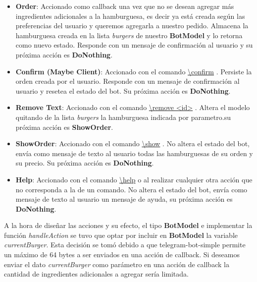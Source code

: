 \documentclass[a4paper,12pt]{article}
\begin{document}
\begin{itemize}
	\item
	\textbf{Order}: Accionado como callback una vez que no se desean agregar más ingredientes adicionales a la hamburguesa, es decir ya está creada según las preferencias del usuario y queremos agregarla a nuestro pedido. Almacena la hamburguesa creada en la lista \textit{burgers} de nuestro \textbf{BotModel} y lo retorna como nuevo estado. Responde con un mensaje de confirmación al usuario y su próxima acción es \textbf{DoNothing}.
	
	\item
	\textbf{Confirm \color{blue}(Maybe Client)\color{black}}: Accionado con el comando 
	\color{blue}\uline{\textbackslash confirm}\color{black}
	. Persiste la orden creada por el usuario. Responde con un mensaje de confirmación al usuario y resetea el estado del bot. Su próxima acción es \textbf{DoNothing}.
	
	\item
	\textbf{Remove \color{blue}Text\color{black}}: Accionado con el comando 
	\color{blue}\uline{\textbackslash remove <id>}\color{black}
	. Altera el modelo quitando de la lista \textit{burgers} la hamburguesa indicada por parametro.su próxima acción es \textbf{ShowOrder}. 
	
	\item
	\textbf{ShowOrder}: Accionado con el comando 
	\color{blue}\uline{\textbackslash show}\color{black}
	. No altera el estado del bot, envía como mensaje de texto al usuario todas las hamburguesas de su orden y su precio. Su próxima acción es \textbf{DoNothing}.
	
	\item
	\textbf{Help}: Accionado con el comando 
	\color{blue}\uline{\textbackslash help}\color{black}
	 o al realizar cualquier otra acción que no corresponda a la de un comando. No altera el estado del bot, envía como mensaje de texto al usuario un mensaje de ayuda, su próxima acción es \textbf{DoNothing}. 
	
\end{itemize}

A la hora de diseñar las acciones y su efecto, el tipo \textbf{BotModel} e implementar la función \textit{handleAction} se tuvo que optar por incluir en \textbf{BotModel} la variable \textit{currentBurger}. Esta decisión se tomó debido a que telegram-bot-simple permite un máximo de 64 bytes a ser enviados en una acción de callback. Si deseamos enviar el dato \textit{currentBurger} como parámetro en una acción de callback la cantidad de ingredientes adicionales a agregar sería limitada.
\end{document}

